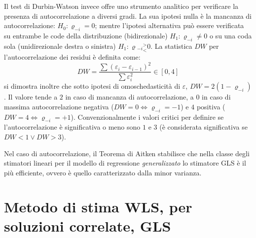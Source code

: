 \documentclass[a4page, 11pt]{article} %
\begin{document}
Il test di Durbin-Watson invece offre uno strumento analitico per verificare la presenza di autocorrelazione a diversi gradi.
La sua ipotesi nulla è la mancanza di autocorrelazione: $H_0: \varrho_{-i} = 0$; mentre l'ipotesi alternativa può essere verificata su entrambe le code della distribuzione (bidirezionale) $H_1: \varrho_{-i} \neq 0$ o su una coda sola (unidirezionale destra o sinistra) $H_1: \varrho{_{-i}} ^>_< 0$.
La statistica $DW$ per l'autocorrelazione dei residui è definita come:
\begin{equation*}
  DW = \frac{\sum{(\varepsilon_i - \varepsilon_{i-1})^2}}{\sum{ \varepsilon_i^2}} \in [0, 4]
\end{equation*}
si dimostra inoltre che sotto ipotesi di omoschedasticità di $\varepsilon$, $DW = 2(1 - \varrho_{-i})$.
Il valore tende a $2$ in caso di mancanza di autocorrelazione, a $0$ in caso di massima autocorrelazione negativa ($DW = 0 \Leftrightarrow \varrho_{-i} = -1$) e $4$ positiva ($DW = 4 \Leftrightarrow \varrho_{-i} = +1$).
Convenzionalmente i valori critici per definire se l'autocorrelazione è significativa o meno sono $1$ e $3$ (è considerata significativa se $DW < 1 \lor DW > 3$).

Nel caso di autocorrelazione, il Teorema di Aitken stabilisce che nella classe degli stimatori lineari per il modello di regressione \textit{generalizzato} lo stimatore GLS è il più efficiente, ovvero è quello caratterizzato dalla minor varianza.

\section{Metodo di stima WLS, per soluzioni correlate, GLS }
\end{document}
